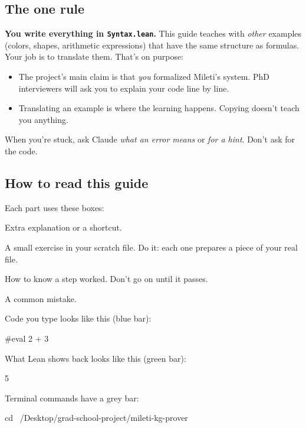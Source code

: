 \documentclass[11pt,a4paper]{article}
\newcommand{\code}[1]{\texttt{#1}}
\begin{document}
\subsection{The one rule}
\textbf{You write everything in \code{Syntax.lean}.} This guide teaches with \emph{other} examples (colors, shapes, arithmetic expressions) that have the same structure as formulas. Your job is to translate them. That's on purpose:
\begin{itemize}
\item The project's main claim is that \emph{you} formalized Mileti's system. PhD interviewers will ask you to explain your code line by line.
\item Translating an example is where the learning happens. Copying doesn't teach you anything.
\end{itemize}
When you're stuck, ask Claude \emph{what an error means} or \emph{for a hint}. Don't ask for the code.

\subsection{How to read this guide}
Each part uses these boxes:

\begin{tip}[Tip] Extra explanation or a shortcut. \end{tip}
\begin{try} A small exercise in your scratch file. Do it: each one prepares a piece of your real file. \end{try}
\begin{okbox}[Check] How to know a step worked. Don't go on until it passes. \end{okbox}
\begin{warn} A common mistake. \end{warn}

Code you type looks like this (blue bar):
\begin{lean}
#eval 2 + 3
\end{lean}
What Lean shows back looks like this (green bar):
\begin{output}
5
\end{output}
Terminal commands have a grey bar:
\begin{shell}
cd ~/Desktop/grad-school-project/mileti-kg-prover
\end{shell}
\end{document}
